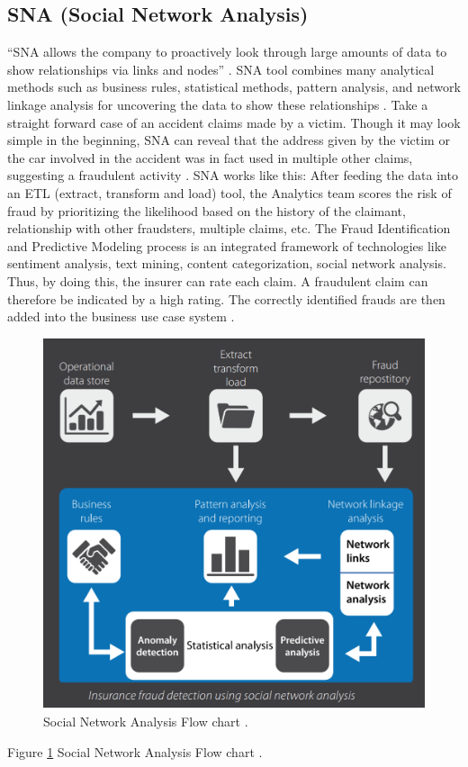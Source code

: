 \documentclass[sigconf]{acmart}
\begin{document}
\subsection{SNA (Social Network Analysis)}
``SNA allows the company to proactively look through large amounts of data to show relationships via links and nodes'' \cite{link9}. SNA tool combines many analytical methods such as business rules, statistical methods, pattern analysis, and network linkage analysis for uncovering the data to show these relationships \cite{link7}. Take a straight forward case of an accident claims made by a victim. Though it may look simple in the beginning, SNA can reveal that the address given by the victim or the car involved in the accident was in fact used in multiple other claims, suggesting a fraudulent activity \cite{link9}. 
SNA works like this: After feeding the data into an ETL (extract, transform and load) tool, the Analytics team scores the risk of fraud by prioritizing the likelihood based on the history of the claimant, relationship with other fraudsters, multiple claims, etc. The Fraud Identification and Predictive Modeling process is an integrated framework of technologies like sentiment analysis, text mining, content categorization, social network analysis. Thus, by doing this, the insurer can rate each claim. A fraudulent claim can therefore be indicated by a high rating. The correctly identified frauds are then added into the business use case system \cite{link9}.
\begin{figure}
  \includegraphics[width=\linewidth]{images/SNA_image1.png}
  \caption{Social Network Analysis Flow chart \cite{link7}.}
  \label{F:Social Network Analysis flowchart}
\end{figure}
Figure \ref{F:Social Network Analysis flowchart} Social Network Analysis Flow chart .\\
\end{document}
